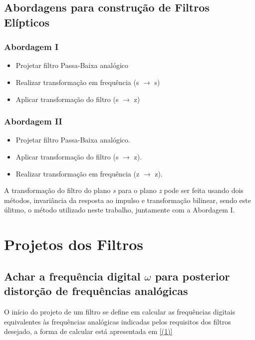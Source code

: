 \documentclass[a4paper,10pt]{article}
\begin{document}
\subsection{Abordagens para construção de Filtros Elípticos}
	\subsubsection{Abordagem I}
	
		\begin{itemize}
			\item Projetar filtro Passa-Baixa analógico
			\item Realizar transformação em frequência (s \(\rightarrow\) s)
			\item Aplicar transformação do filtro (s \(\rightarrow\) z)
		\end{itemize}

	\subsubsection{Abordagem II}
		\begin{itemize}
			\item Projetar filtro Passa-Baixa analógico.
		\end{itemize}
		\begin{itemize}
			\item Aplicar transformação do filtro (s $\rightarrow$ z).	
		\end{itemize}	
		\begin{itemize}
			\item Realizar transformação em frequência (z $\rightarrow$ z).
		\end{itemize}	
	
	
	A transformação do filtro do plano \textit{s} para o plano \textit{z} pode ser feita usando dois métodos, invariância da resposta ao impulso e transformação bilinear, sendo este úlitmo, o método utilizado neste trabalho, juntamente com a Abordagem I.
	
\section{Projetos dos Filtros}

\subsection{Achar a frequência digital \(\omega\) para posterior distorção de frequências analógicas}
	O início do projeto de um filtro se define em calcular as frequências digitais equivalentes às frequências analógicas indicadas pelos requisitos dos filtros desejado, a forma de calcular está apresentada em \eqref{(1)}
	
\end{document}
